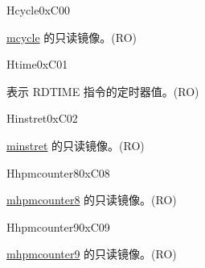 \begin{register}{H}{cycle}{0xC00}\label{regdesc:CYCLE}
%
\regnewline%
\begin{regdesc}\begin{reglist}
\label{fielddesc:CYCLE}\item [CYCLE] \hyperref[regdesc:MCYCLE]{mcycle} 的只读镜像。(RO)
\end{reglist}\end{regdesc}
\end{register}

\begin{register}{H}{time}{0xC01}\label{regdesc:TIME}
%
\regnewline%
\begin{regdesc}\begin{reglist}
\label{fielddesc:TIME}\item [TIME] 表示 RDTIME 指令的定时器值。(RO)
\end{reglist}\end{regdesc}
\end{register}

\begin{register}{H}{instret}{0xC02}\label{regdesc:INSTRET}
%
\regnewline%
\begin{regdesc}\begin{reglist}
\label{fielddesc:INSTRET}\item [INSTRET] \hyperref[regdesc:MINSTRET]{minstret} 的只读镜像。(RO)
\end{reglist}\end{regdesc}
\end{register}

\begin{register}{H}{hpmcounter8}{0xC08}\label{regdesc:HPMCOUNTER8}
%
\regnewline%
\begin{regdesc}\begin{reglist}
\label{fielddesc:HPMCOUNTER8}\item [HPMCOUNTER8] \hyperref[regdesc:MHPMCOUNTER8]{mhpmcounter8} 的只读镜像。(RO)
\end{reglist}\end{regdesc}
\end{register}


\begin{register}{H}{hpmcounter9}{0xC09}\label{regdesc:HPMCOUNTER9}
%
\regnewline%
\begin{regdesc}\begin{reglist}
\label{fielddesc:HPMCOUNTER9}\item [HPMCOUNTER9] \hyperref[regdesc:MHPMCOUNTER9]{mhpmcounter9} 的只读镜像。(RO)
\end{reglist}\end{regdesc}
\end{register}

